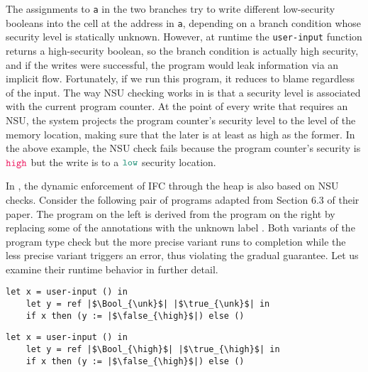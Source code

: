 \noindent
The assignments to \texttt{a} in the two branches try to write different
low-security booleans into the cell at the address in \texttt{a}, depending on a
branch condition whose security level is statically unknown. However, at runtime
the \texttt{user-input} function returns a high-security boolean, so the branch
condition is actually high security, and if the writes were successful, the
program would leak information via an implicit flow. Fortunately, if we run this
program, it reduces to blame regardless of the input. The way NSU checking works
in \Surface is that a security level is associated with the current program
counter. At the point of every write that requires an NSU, the system projects
the program counter's security level to the level of the memory location, making
sure that the later is at least as high as the former. In the above example, the
NSU check fails because the program counter's security is $\high$ but the write
is to a $\low$ security location.

In \GSLRef \parencite{Toro:2018aa}, the dynamic enforcement of IFC through the
heap is also based on NSU checks. Consider the following pair of programs
adapted from Section 6.3 of their paper. The program on the left is derived from
the program on the right by replacing some of the {\high} annotations with the
unknown label \unk. Both variants of the program type check but the more precise
variant runs to completion while the less precise variant triggers an error,
thus violating the gradual guarantee. Let us examine their runtime behavior in
further detail.

\begin{multicols}{2}
  \small
  \noindent
  \begin{lstlisting}[style=tt,basicstyle=\ttfamily\footnotesize]
    let x = user-input () in
    let y = ref |$\Bool_{\unk}$| |$\true_{\unk}$| in
    if x then (y := |$\false_{\high}$|) else ()
  \end{lstlisting}
  \columnbreak
  \begin{lstlisting}[style=tt,basicstyle=\ttfamily\footnotesize]
    let x = user-input () in
    let y = ref |$\Bool_{\high}$| |$\true_{\high}$| in
    if x then (y := |$\false_{\high}$|) else ()
  \end{lstlisting}
\end{multicols}

